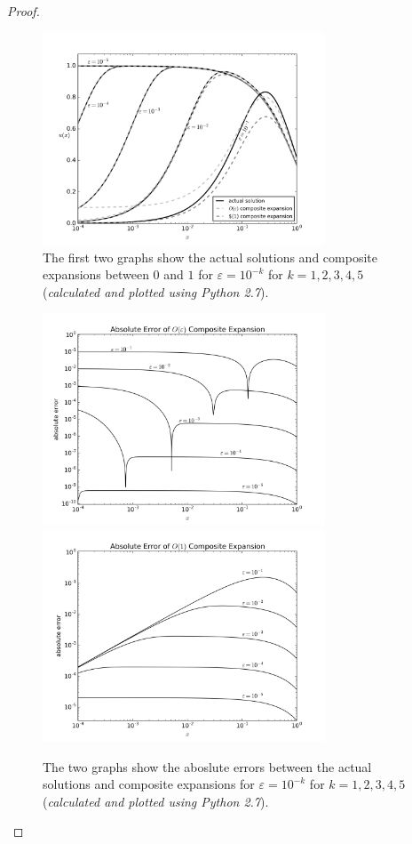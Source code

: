 \documentclass{article} %
\theoremstyle{plain}
\newcommand{\E}{\varepsilon}
\numberwithin{equation}{section} %
\numberwithin{figure}{section} %
\numberwithin{table}{section} %
\begin{document}
\begin{proof}
\begin{figure}
        \includegraphics[width=0.75\textwidth]{semilog.png}\vspace{-0.22cm}
        \caption{The first two graphs show the actual solutions and composite expansions between $0$ and $1$ for $\E = 10^{-k}$ for $k = 1, 2, 3, 4, 5$ (\emph{calculated and plotted using Python 2.7}).}
        \label{problem_1_graphs}
    \end{figure}
    \begin{figure}
        \centering
        \includegraphics[width=0.75\textwidth]{errors_epsilon.png}\vspace{-0.22cm
        }
        \includegraphics[width=0.75\textwidth]{errors_1.png}\vspace{-0.22cm}
        \caption{The two graphs show the aboslute errors between the actual solutions and composite expansions for $\E = 10^{-k}$ for $k = 1, 2, 3, 4, 5$ (\emph{calculated and plotted using Python 2.7}).}
        \label{problem_1_graphs_errors}
    \end{figure}
\end{proof}
\end{document}
